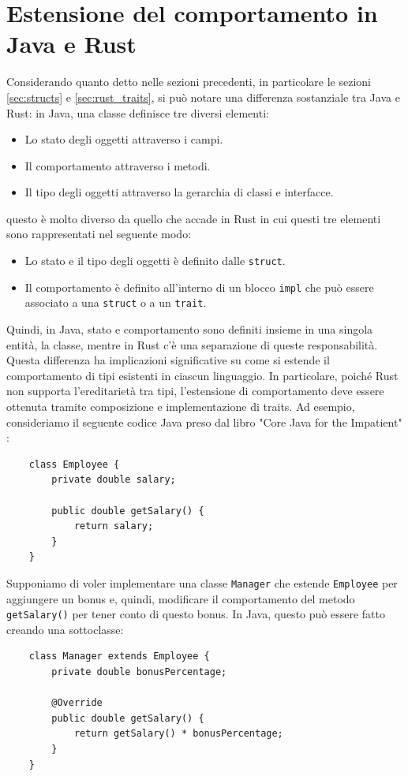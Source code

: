 \section{Estensione del comportamento in Java e Rust}
\label{sec:extending_behavior}
Considerando quanto detto nelle sezioni precedenti, in particolare le sezioni \ref{sec:structs} e \ref{sec:rust_traits}, si può notare una differenza sostanziale tra Java e Rust: in Java, una classe definisce tre diversi elementi:
\begin{itemize}
    \item Lo stato degli oggetti attraverso i campi.
    \item Il comportamento attraverso i metodi.
    \item Il tipo degli oggetti attraverso la gerarchia di classi e interfacce.
\end{itemize}
questo è molto diverso da quello che accade in Rust in cui questi tre elementi sono rappresentati nel seguente modo:
\begin{itemize}
    \item Lo stato e il tipo degli oggetti è definito dalle \texttt{struct}.
    \item Il comportamento è definito all'interno di un blocco \texttt{impl} che può essere associato a una \texttt{struct} o a un \texttt{trait}.
\end{itemize}
Quindi, in Java, stato e comportamento sono definiti insieme in una singola entità, la classe, mentre in Rust c'è una separazione di queste responsabilità. Questa differenza ha implicazioni significative su come si estende il comportamento di tipi esistenti in ciascun linguaggio. In particolare, poiché Rust non supporta l'ereditarietà tra tipi, l'estensione di comportamento deve essere ottenuta tramite composizione e implementazione di traits. Ad esempio, consideriamo il seguente codice Java preso dal libro "Core Java for the Impatient" \cite{horstmann-java-impatient}:
\begin{verbatim}
    class Employee {
        private double salary;
        
        public double getSalary() {
            return salary;
        }
    }
\end{verbatim}
Supponiamo di voler implementare una classe \texttt{Manager} che estende \texttt{Employee} per aggiungere un bonus e, quindi, modificare il comportamento del metodo \texttt{getSalary()} per tener conto di questo bonus. In Java, questo può essere fatto creando una sottoclasse:
\begin{verbatim}
    class Manager extends Employee {
        private double bonusPercentage;

        @Override
        public double getSalary() {
            return getSalary() * bonusPercentage;
        }
    }
\end{verbatim}
